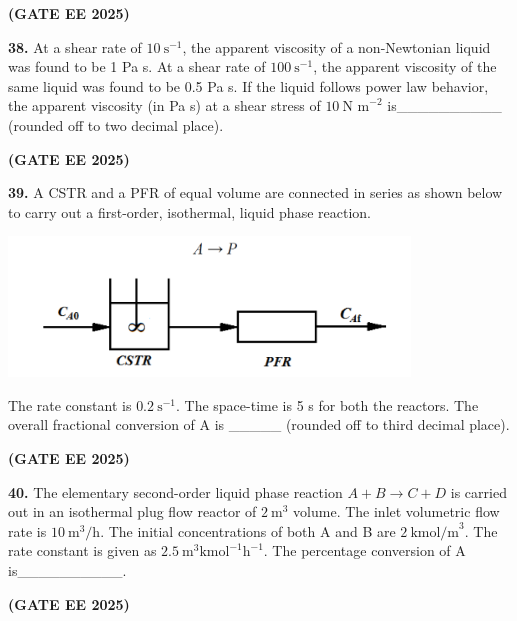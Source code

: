 \documentclass[journal,12pt,onecolumn]{IEEEtran}
\newcommand{\brak}[1]{(#1)}
\begin{document}
\hfill \textbf{\brak{GATE EE 2025}}

\noindent\textbf{38.} At a shear rate of $10~\text{s}^{-1}$, the apparent viscosity of a non-Newtonian liquid was found to be 1 Pa s. At a shear rate of $100~\text{s}^{-1}$, the apparent viscosity of the same liquid was found to be 0.5 Pa s. If the liquid follows power law behavior, the apparent viscosity \brak{in Pa s} at a shear stress of $10~\text{N m}^{-2}$ is\_\_\_\_\_\_\_\_\_\_ \brak{rounded off to two decimal place}.

\hfill \textbf{\brak{GATE EE 2025}}

\noindent\textbf{39.} A CSTR and a PFR of equal volume are connected in series as shown below to carry out a first-order, isothermal, liquid phase reaction.
\begin{center}
\includegraphics[width=0.8\textwidth]{figs/39.png}
\end{center}
The rate constant is $0.2~\text{s}^{-1}$. The space-time is 5 s for both the reactors. The overall fractional conversion of A is \_\_\_\_\_ \brak{rounded off to third decimal place}.

\hfill \textbf{\brak{GATE EE 2025}}

\noindent\textbf{40.} The elementary second-order liquid phase reaction $A+B\rightarrow C+D$ is carried out in an isothermal plug flow reactor of $2~\text{m}^{3}$ volume. The inlet volumetric flow rate is $10~\text{m}^{3}/\text{h}$. The initial concentrations of both A and B are $2~\text{kmol/m}^{3}$. The rate constant is given as $2.5~\text{m}^{3} \text{kmol}^{-1} \text{h}^{-1}$. The percentage conversion of A is\_\_\_\_\_\_\_\_\_\_.


\hfill \textbf{\brak{GATE EE 2025}}
\end{document}
